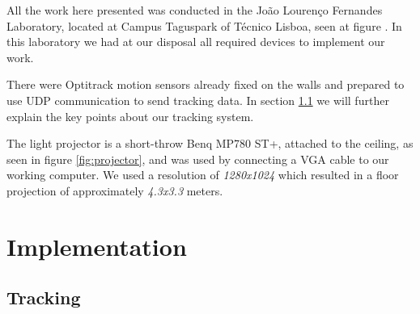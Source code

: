 
All the work here presented was conducted in the Jo\~ao Louren\c{c}o Fernandes Laboratory, located at Campus Taguspark of T\'ecnico Lisboa, seen at figure .
In this laboratory we had at our disposal all required devices to implement our work.

There were Optitrack motion sensors already fixed on the walls and prepared to use UDP communication to send tracking data. 
In section \ref{prototype-tracking} we will further explain the key points about our tracking system.

The light projector is a short-throw Benq MP780 ST+, attached to the ceiling, as seen in figure \ref{fig:projector}, and
was used by connecting a VGA cable to our working computer. We used a resolution of \textit{1280x1024} which resulted in a floor projection of approximately \textit{4.3x3.3} 
meters.

\section{Implementation}

\subsection{Tracking}
\label{prototype-tracking}

